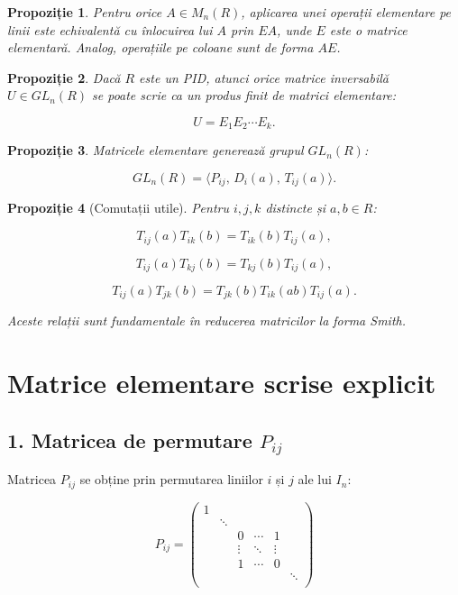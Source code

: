 \documentclass[12pt]{article}
\theoremstyle{definition}
\theoremstyle{plain}
\newtheorem{proposition}{Propoziție}
\begin{document}
\begin{proposition}
Pentru orice $A \in M_n(R)$, aplicarea unei operații elementare pe linii este echivalentă cu
înlocuirea lui $A$ prin $EA$, unde $E$ este o matrice elementară.
Analog, operațiile pe coloane sunt de forma $AE$.
\end{proposition}

\begin{proposition}
Dacă $R$ este un PID, atunci orice matrice inversabilă $U \in GL_n(R)$ se poate scrie ca un produs finit de matrici elementare:


\[
U = E_1 E_2 \cdots E_k.
\]


\end{proposition}

\begin{proposition}
Matricele elementare generează grupul $GL_n(R)$:


\[
GL_n(R) = \langle P_{ij},\, D_i(a),\, T_{ij}(a) \rangle.
\]


\end{proposition}

\begin{proposition}[Comutații utile]
Pentru $i,j,k$ distincte și $a,b \in R$:


\[
T_{ij}(a) T_{ik}(b) = T_{ik}(b) T_{ij}(a),
\]




\[
T_{ij}(a) T_{kj}(b) = T_{kj}(b) T_{ij}(a),
\]




\[
T_{ij}(a) T_{jk}(b) = T_{jk}(b) T_{ik}(ab) T_{ij}(a).
\]


Aceste relații sunt fundamentale în reducerea matricilor la forma Smith.
\end{proposition}



\section*{Matrice elementare scrise explicit}

\subsection*{1. Matricea de permutare $P_{ij}$}

Matricea $P_{ij}$ se obține prin permutarea liniilor $i$ și $j$ ale lui $I_n$:



\[
P_{ij} =
\begin{pmatrix}
1      &        &        &        &        &        \\
       & \ddots &        &        &        &        \\
       &        & 0      & \cdots & 1      &        \\
       &        & \vdots & \ddots & \vdots &        \\
       &        & 1      & \cdots & 0      &        \\
       &        &        &        &        & \ddots \\
\end{pmatrix}
\]
\end{document}
